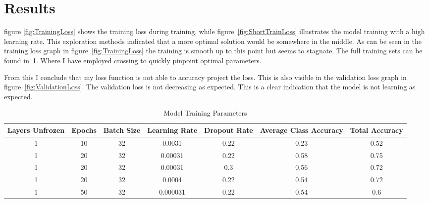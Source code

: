 \documentclass{article}
\begin{document}
\section{Results}

figure \ref{fig:TrainingLoss} shows the training loss during training, while figure~\ref{fig:ShortTrainLoss} illustrates the model training with a high learning rate. This exploration methods indicated that a more optimal solution would be somewhere in the middle. As can be seen in the training loss graph in figure~\ref{fig:TrainingLoss} the training is smooth up to this point but seems to stagnate. The full training sets can be found in~\ref{tab:model_parameters}. Where I have employed crossing to quickly pinpoint optimal parameters. 

From this I conclude that my loss function is not able to accuracy project the loss. This is also visible in the validation loss graph in figure~\ref{fig:ValidationLoss}. The validation loss is not decreasing as expected. This is a clear indication that the model is not learning as expected.

\begin{table}[ht]
    \centering
    \begin{tabular}{ccccccc}
    \hline
    \textbf{Layers Unfrozen} & \textbf{Epochs} & \textbf{Batch Size} & \textbf{Learning Rate} & \textbf{Dropout Rate} & \textbf{Average Class Accuracy} & \textbf{Total Accuracy} \\
    \hline
    1 & 10 & 32 & 0.0031 & 0.22 & 0.23 & 0.52 \\
    1 & 20 & 32 & 0.00031 & 0.22 & 0.58 & 0.75 \\
    1 & 20 & 32 & 0.00031 & 0.3 & 0.56 & 0.72 \\
    1 & 20 & 32 & 0.0004 & 0.22 & 0.54 & 0.72 \\
    1 & 50 & 32 & 0.000031 & 0.22 & 0.54 & 0.6 \\
    \hline
    \end{tabular}
    \caption{Model Training Parameters}
    \label{tab:model_parameters}
\end{table}
\end{document}

